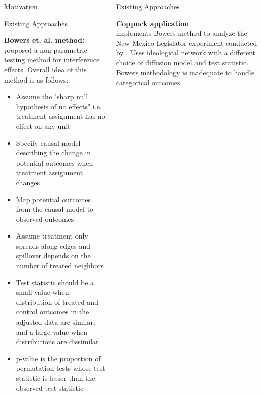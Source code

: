 \documentclass[final]{beamer}
\newlength{\onecolwid}
\newlength{\onecolwidd}
\begin{document}
\begin{frame}[t]
\begin{columns}[t]
\begin{column}{\onecolwidd}
\begin{block}{Motivation}
\begin{rmfamily}
	\end{rmfamily}
	\end{block}
	
	\begin{block}{Existing Approaches}
		\begin{rmfamily}
	
	{\large \textbf{Bowers et. al. method:}}\\
	\citealt{bowers2012reasoning} proposed a non-parametric testing method for interference effects. Overall idea of this method is as follows:

	\begin{itemize}
	\item Assume the "sharp null hypothesis of no effects" i.e. treatment assignment has no effect on any unit
	\vspace*{.1in}
	\item Specify causal model describing the change in potential outcomes when treatment assignment changes
	\vspace*{.1in}
	\item  Map potential outcomes from the causal model to observed outcomes
	\vspace*{.1in}
	\item Assume treatment only spreads along edges and spillover depends on the number of treated neighbors
	\vspace*{.1in}	
	\item Test statistic should be a small value when distribution of treated and control outcomes in the adjusted data are similar, and a large value when distributions are dissimilar
	\vspace*{.1in}
	\item p-value is the proportion of permutation tests whose test statistic is lesser than the observed test statistic
	\vspace*{.1in}	
	\end{itemize}
	\end{rmfamily}
	\end{block}
	

\end{column}		
	\begin{column}{\onecolwidd}
	
	\begin{block}{Existing Approaches}
		\begin{rmfamily}
	
	{\large \textbf{Coppock application}}\\
	\citealt{coppock2014information} implements Bowers method to analyze the New Mexico Legislator experiment conducted by \citealt{butler2011can}. Uses ideological network with a different choice of diffusion model and test statistic. Bowers methodology is inadequate to handle categorical outcomes.
	

\end{rmfamily}
\end{block}
\end{column}
\end{columns}
\end{frame}
\end{document}

